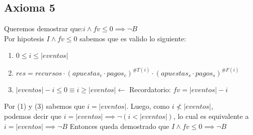 \documentclass[../document.tex]{subfiles}
\begin{document}
\subsection*{Axioma 5}
\noindent Queremos demostrar que:\hspace{3em}$i\land fv\leq 0 \implies \lnot B$
\\Por hipotesis $I\land fv\leq 0$ sabemos que es valido lo siguiente:
\begin{enumerate}
    \item $0\leq i \leq |eventos|$
    \item $res=recursos\cdot(apuestas_c\cdot pagos_c)^{\#T(i)}\cdot(apuestas_s\cdot pagos_s)^{\#F(i)}$
    \item $|eventos|-i\leq 0 \equiv i \geq |eventos|$\hfill{\color{BlueViolet}$\longleftarrow$ Recordatorio: $fv=|eventos|-i$}
\end{enumerate}
\salto{\baselineskip}
Por (1) y (3) sabemos que $i=|eventos|$. Luego, como $i\not<|eventos|$, 
\\podemos decir que $i=|eventos|\implies \lnot(i<|eventos|)$, lo cual es equivalente a
$i=|eventos|\implies \lnot B$
\salto{\baselineskip}
Entonces queda demostrado que $I\land fv\leq 0 \implies \lnot B$
\end{document}

